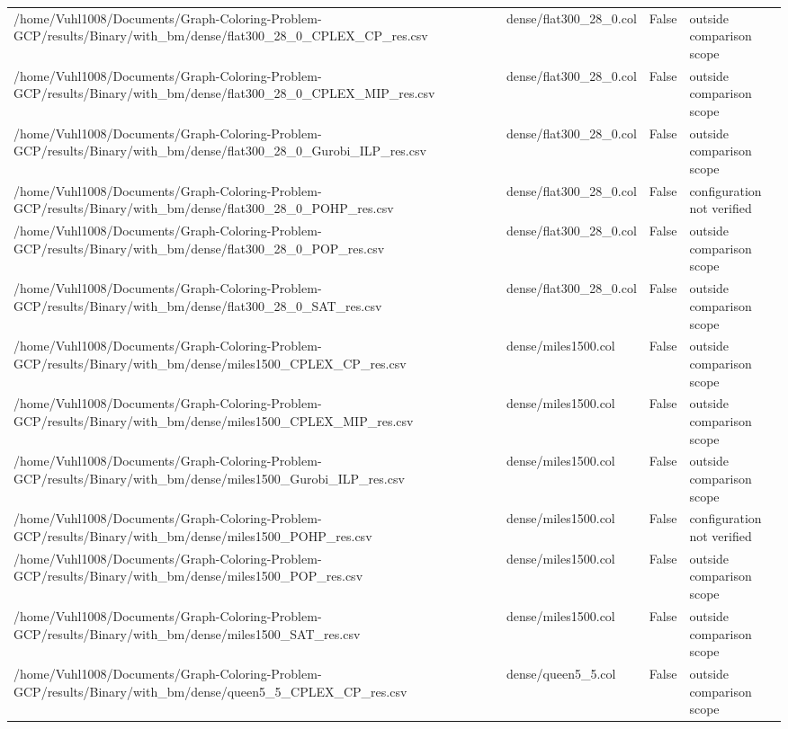 \begin{table}[htbp]
\begin{tabular}{llll}
/home/Vuhl1008/Documents/Graph-Coloring-Problem-GCP/results/Binary/with\_bm/dense/flat300\_28\_0\_CPLEX\_CP\_res.csv & dense/flat300\_28\_0.col & False & outside comparison scope \\
/home/Vuhl1008/Documents/Graph-Coloring-Problem-GCP/results/Binary/with\_bm/dense/flat300\_28\_0\_CPLEX\_MIP\_res.csv & dense/flat300\_28\_0.col & False & outside comparison scope \\
/home/Vuhl1008/Documents/Graph-Coloring-Problem-GCP/results/Binary/with\_bm/dense/flat300\_28\_0\_Gurobi\_ILP\_res.csv & dense/flat300\_28\_0.col & False & outside comparison scope \\
/home/Vuhl1008/Documents/Graph-Coloring-Problem-GCP/results/Binary/with\_bm/dense/flat300\_28\_0\_POHP\_res.csv & dense/flat300\_28\_0.col & False & configuration not verified \\
/home/Vuhl1008/Documents/Graph-Coloring-Problem-GCP/results/Binary/with\_bm/dense/flat300\_28\_0\_POP\_res.csv & dense/flat300\_28\_0.col & False & outside comparison scope \\
/home/Vuhl1008/Documents/Graph-Coloring-Problem-GCP/results/Binary/with\_bm/dense/flat300\_28\_0\_SAT\_res.csv & dense/flat300\_28\_0.col & False & outside comparison scope \\
/home/Vuhl1008/Documents/Graph-Coloring-Problem-GCP/results/Binary/with\_bm/dense/miles1500\_CPLEX\_CP\_res.csv & dense/miles1500.col & False & outside comparison scope \\
/home/Vuhl1008/Documents/Graph-Coloring-Problem-GCP/results/Binary/with\_bm/dense/miles1500\_CPLEX\_MIP\_res.csv & dense/miles1500.col & False & outside comparison scope \\
/home/Vuhl1008/Documents/Graph-Coloring-Problem-GCP/results/Binary/with\_bm/dense/miles1500\_Gurobi\_ILP\_res.csv & dense/miles1500.col & False & outside comparison scope \\
/home/Vuhl1008/Documents/Graph-Coloring-Problem-GCP/results/Binary/with\_bm/dense/miles1500\_POHP\_res.csv & dense/miles1500.col & False & configuration not verified \\
/home/Vuhl1008/Documents/Graph-Coloring-Problem-GCP/results/Binary/with\_bm/dense/miles1500\_POP\_res.csv & dense/miles1500.col & False & outside comparison scope \\
/home/Vuhl1008/Documents/Graph-Coloring-Problem-GCP/results/Binary/with\_bm/dense/miles1500\_SAT\_res.csv & dense/miles1500.col & False & outside comparison scope \\
/home/Vuhl1008/Documents/Graph-Coloring-Problem-GCP/results/Binary/with\_bm/dense/queen5\_5\_CPLEX\_CP\_res.csv & dense/queen5\_5.col & False & outside comparison scope \\

\end{tabular}
\end{table}
